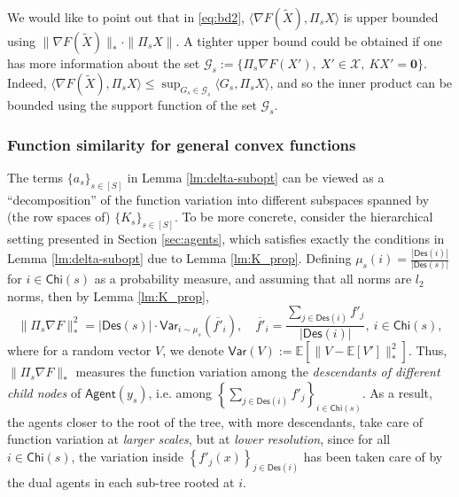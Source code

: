 \documentclass[10pt]{article}
\newcommand{\mc}{\mathcal}
\newcommand{\mb}{\mathbf}
\newcommand{\E}{\mathbb{E}}
\newcommand{\var}{\mathsf{Var}}
\newcommand{\agent}{\mathsf{Agent}}
\newcommand{\child}{\mathsf{Chi}}
\newcommand{\Descendant}{\mathsf{Des}}
\begin{document}
We would like to point out that in \eqref{eq:bd2}, $\langle \nabla F(\widetilde{X}),\Pi_s X\rangle$ is upper bounded using $\| \nabla F(\widetilde{X})\|_*\cdot \|\Pi_s X\|$. A tighter upper bound could be obtained if one has more information about the set $\mc G_s:=\{\Pi_s \nabla F(X'),~X'\in {\mc X},~KX' = \mb 0\}$. Indeed, $\langle \nabla F(\widetilde{X}),\Pi_s X\rangle\leq \sup_{G_s\in \mc G_s} \langle G_s,\Pi_s X\rangle$, and so the inner product can be bounded using the support function of the set $\mc G_s$.  

\subsubsection{Function similarity for general convex functions}\label{sec:func_simi}
The terms $\{a_s\}_{s\in [S]}$ in Lemma \ref{lm:delta-subopt} can be viewed as a ``decomposition'' of the function variation into different subspaces spanned by (the row spaces of) $\{K_s\}_{s\in [S]}$. To be more concrete, consider the hierarchical setting presented in Section \ref{sec:agents}, which satisfies exactly the conditions in Lemma \ref{lm:delta-subopt} due to Lemma \ref{lm:K_prop}. Defining $\mu_s(i) = \frac{|\Descendant(i)|}{|\Descendant(s)|}$ for $i\in \child(s)$ as a probability measure, and assuming that all norms are $l_2$ norms, then by Lemma \ref{lm:K_prop}, 
\begin{equation}\label{eq:var_interp}
    \|\Pi_s \nabla F\|_*^2 = |\Descendant(s)|\cdot\var_{i\sim \mu_s}(\overline{f'}_i),\quad \overline{f'}_i = \frac{\sum_{j\in \Descendant(i)}f'_j}{|\Descendant(i)|},~i\in \child(s),
\end{equation}
where for a random vector $V$, we denote $\var(V):= \E[\|V-\E[V']\|_*^2]$. Thus, $\|\Pi_s \nabla F\|_*$ measures the function variation among the \textit{descendants of different child nodes} of $\agent(y_s)$, i.e. among $\left\{\sum_{j\in \Descendant(i)} f'_j\right\}_{i\in \child(s)}$. As a result, the agents closer to the root of the tree, with more descendants, take care of function variation at \textit{larger scales}, but at \textit{lower resolution}, since for all $i\in \child(s)$, the variation inside $\left\{ f'_j(x)\right\}_{j\in \Descendant(i)}$ has been taken care of by the dual agents in each sub-tree rooted at $i$.
\end{document}
